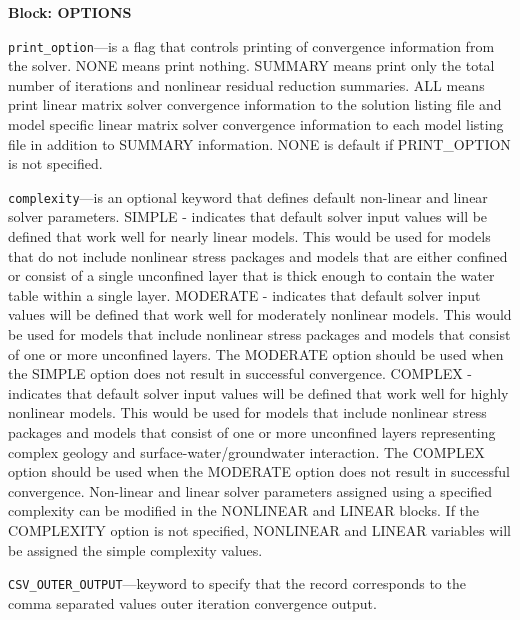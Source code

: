 
\item \textbf{Block: OPTIONS}

\begin{description}
\item \texttt{print\_option}---is a flag that controls printing of convergence information from the solver.  NONE means print nothing. SUMMARY means print only the total number of iterations and nonlinear residual reduction summaries. ALL means print linear matrix solver convergence information to the solution listing file and model specific linear matrix solver convergence information to each model listing file in addition to SUMMARY information. NONE is default if PRINT\_OPTION is not specified.

\item \texttt{complexity}---is an optional keyword that defines default non-linear and linear solver parameters.  SIMPLE - indicates that default solver input values will be defined that work well for nearly linear models. This would be used for models that do not include nonlinear stress packages and models that are either confined or consist of a single unconfined layer that is thick enough to contain the water table within a single layer. MODERATE - indicates that default solver input values will be defined that work well for moderately nonlinear models. This would be used for models that include nonlinear stress packages and models that consist of one or more unconfined layers. The MODERATE option should be used when the SIMPLE option does not result in successful convergence.  COMPLEX - indicates that default solver input values will be defined that work well for highly nonlinear models. This would be used for models that include nonlinear stress packages and models that consist of one or more unconfined layers representing complex geology and surface-water/groundwater interaction. The COMPLEX option should be used when the MODERATE option does not result in successful convergence.  Non-linear and linear solver parameters assigned using a specified complexity can be modified in the NONLINEAR and LINEAR blocks. If the COMPLEXITY option is not specified, NONLINEAR and LINEAR variables will be assigned the simple complexity values.

\item \texttt{CSV\_OUTER\_OUTPUT}---keyword to specify that the record corresponds to the comma separated values outer iteration convergence output.


\end{description}
